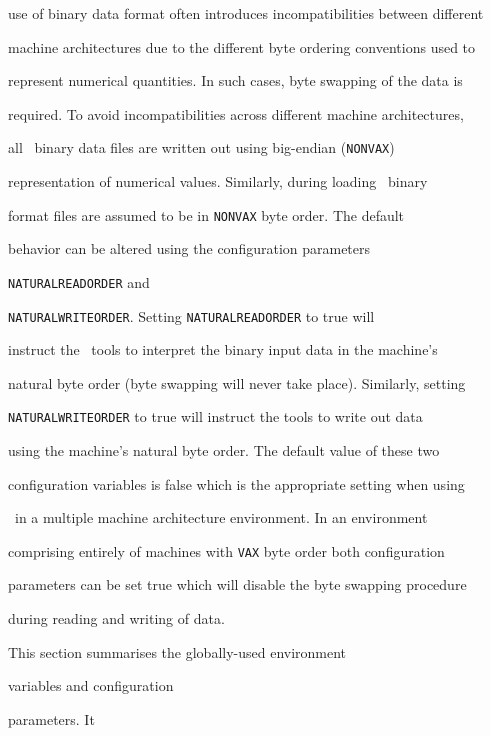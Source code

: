 use of binary data format often introduces incompatibilities between different


machine architectures due to the different byte ordering conventions used to


represent numerical quantities. In such cases, byte swapping of the data is


required. To avoid incompatibilities across different machine architectures,


all \HTK\ binary data files are written out using big-endian (\texttt{NONVAX})


representation of numerical values. Similarly, during loading \HTK\ binary


format files are assumed to be in \texttt{NONVAX} byte order. The default


behavior can be altered using the configuration parameters


\texttt{NATURALREADORDER} and


\texttt{NATURALWRITEORDER}. Setting \texttt{NATURALREADORDER} to true will


instruct the \HTK\ tools to interpret the binary input data in the machine's


natural byte order (byte swapping will never take place). Similarly, setting


\texttt{NATURALWRITEORDER} to true will instruct the tools to write out data


using the machine's natural byte order. The default value of these two


configuration variables is false which is the appropriate setting when using


\HTK\ in a multiple machine architecture environment. In an environment


comprising entirely of machines with \texttt{VAX} byte order both configuration


parameters can be set true which will disable the byte swapping procedure


during reading and writing of data.










This section summarises the globally-used environment


variables and configuration


parameters. It


